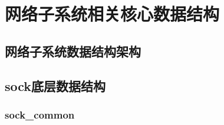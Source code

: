 \chapter{网络子系统相关核心数据结构}
\minitoc
    \section{网络子系统数据结构架构}    
    \section{sock底层数据结构}  
        \subsection{sock\_common}

